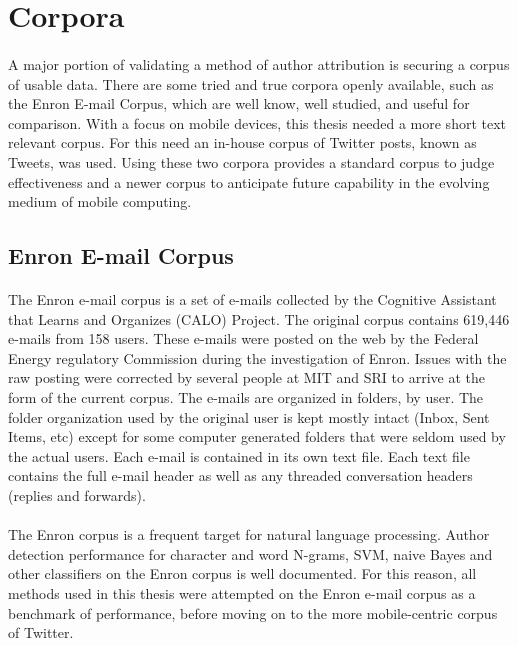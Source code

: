 \section{Corpora}
	\paragraph{}A major portion of validating a method of author attribution is securing a corpus of usable data.  There are some tried and true corpora openly available, such as the Enron E-mail Corpus, which are well know, well studied, and useful for comparison.  With a focus on mobile devices, this thesis needed a more short text relevant corpus.  For this need an in-house corpus of Twitter posts, known as Tweets, was used.  Using these two corpora provides a standard corpus to judge effectiveness and a newer corpus to anticipate future capability in the evolving medium of mobile computing.
	\subsection{Enron E-mail Corpus}
		\paragraph{} The Enron e-mail corpus is a set of e-mails collected by the Cognitive Assistant that Learns and Organizes (CALO) Project.  The original corpus contains 619,446 e-mails from 158 users.  These e-mails were posted on the web by the Federal Energy regulatory Commission during the investigation of Enron.  Issues with the raw posting were corrected by several people at MIT and SRI to arrive at the form of the current corpus.  The e-mails are organized in folders, by user.  The folder organization used by the original user is kept mostly intact (Inbox, Sent Items, etc) except for some computer generated folders that were seldom used by the actual users.  Each e-mail is contained in its own text file.  Each text file contains the full e-mail header as well as any threaded conversation headers (replies and forwards).\cite{_enron_????}
		\paragraph{} The Enron corpus is a frequent target for natural language processing.  Author detection performance for character and word N-grams, SVM, naive Bayes and other classifiers on the Enron corpus is well documented. For this reason, all methods used in this thesis were attempted on the Enron e-mail corpus as a benchmark of performance, before moving on to the more mobile-centric corpus of Twitter.


